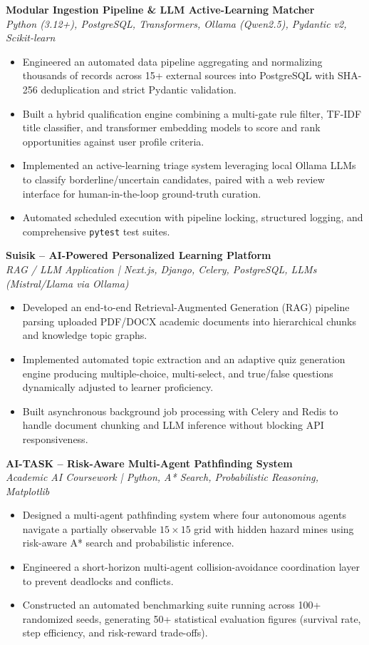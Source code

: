 \documentclass[a4paper,10pt]{article}
\begin{document}
\textbf{Modular Ingestion Pipeline \& LLM Active-Learning Matcher} \\
\textit{Python (3.12+), PostgreSQL, Transformers, Ollama (Qwen2.5), Pydantic v2, Scikit-learn}
\begin{itemize}
    \item Engineered an automated data pipeline aggregating and normalizing thousands of records across 15+ external sources into PostgreSQL with SHA-256 deduplication and strict Pydantic validation.
    \item Built a hybrid qualification engine combining a multi-gate rule filter, TF-IDF title classifier, and transformer embedding models to score and rank opportunities against user profile criteria.
    \item Implemented an active-learning triage system leveraging local Ollama LLMs to classify borderline/uncertain candidates, paired with a web review interface for human-in-the-loop ground-truth curation.
    \item Automated scheduled execution with pipeline locking, structured logging, and comprehensive \texttt{pytest} test suites.
\end{itemize}

\vspace{3pt}
\textbf{Suisik -- AI-Powered Personalized Learning Platform} \\
\textit{RAG / LLM Application | Next.js, Django, Celery, PostgreSQL, LLMs (Mistral/Llama via Ollama)}
\begin{itemize}
    \item Developed an end-to-end Retrieval-Augmented Generation (RAG) pipeline parsing uploaded PDF/DOCX academic documents into hierarchical chunks and knowledge topic graphs.
    \item Implemented automated topic extraction and an adaptive quiz generation engine producing multiple-choice, multi-select, and true/false questions dynamically adjusted to learner proficiency.
    \item Built asynchronous background job processing with Celery and Redis to handle document chunking and LLM inference without blocking API responsiveness.
\end{itemize}

\vspace{3pt}
\textbf{AI-TASK -- Risk-Aware Multi-Agent Pathfinding System} \\
\textit{Academic AI Coursework | Python, A* Search, Probabilistic Reasoning, Matplotlib}
\begin{itemize}
    \item Designed a multi-agent pathfinding system where four autonomous agents navigate a partially observable $15\times15$ grid with hidden hazard mines using risk-aware A* search and probabilistic inference.
    \item Engineered a short-horizon multi-agent collision-avoidance coordination layer to prevent deadlocks and conflicts.
    \item Constructed an automated benchmarking suite running across 100+ randomized seeds, generating 50+ statistical evaluation figures (survival rate, step efficiency, and risk-reward trade-offs).
\end{itemize}
\end{document}
